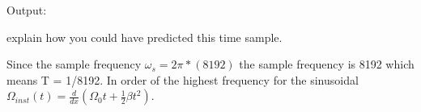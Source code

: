 {\LARGE Output:}

explain how you could have predicted this time sample.

Since the sample frequency $\omega_s = 2\pi*(8192)$ the sample frequency is 8192 which means T = 1/8192. In order of the highest frequency for the sinusoidal $\Omega_{inst}(t)  =  \frac{ d}{d x} ( \Omega_0 t + \frac{1}{2} \beta t^2 ) $.

\pagebreak

